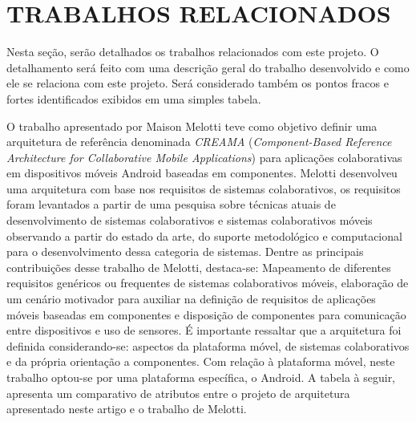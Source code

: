 
\section{TRABALHOS RELACIONADOS}
Nesta seção, serão detalhados os trabalhos relacionados com este projeto. O detalhamento será feito com uma descrição geral do trabalho desenvolvido e como ele se relaciona com este projeto. Será considerado também os pontos fracos e fortes identificados exibidos em uma simples tabela.

O trabalho apresentado por Maison Melotti \cite{melotti_2014} teve como objetivo definir uma arquitetura de referência denominada \textit{CREAMA} (\textit{Component-Based Reference Architecture for Collaborative Mobile Applications}) para aplicações colaborativas em dispositivos móveis Android baseadas em componentes. Melotti desenvolveu uma arquitetura com base nos requisitos de sistemas colaborativos, os requisitos foram levantados a partir de uma pesquisa sobre técnicas atuais de desenvolvimento de sistemas colaborativos e sistemas colaborativos móveis observando a partir do estado da arte, do suporte metodológico e computacional para o desenvolvimento dessa categoria de sistemas. Dentre as principais contribuições desse trabalho de Melotti, destaca-se: Mapeamento de diferentes requisitos genéricos ou frequentes de sistemas colaborativos móveis, elaboração de um cenário motivador para auxiliar na definição de requisitos de aplicações móveis baseadas em componentes e disposição de componentes para comunicação entre dispositivos e uso de sensores. É importante ressaltar que a arquitetura foi definida considerando-se: aspectos da plataforma móvel, de sistemas colaborativos e da própria orientação a componentes. Com relação à plataforma móvel, neste trabalho optou-se por uma plataforma específica, o Android. A tabela à seguir, apresenta um comparativo de atributos entre o projeto de arquitetura apresentado neste artigo e o trabalho de Melotti.

